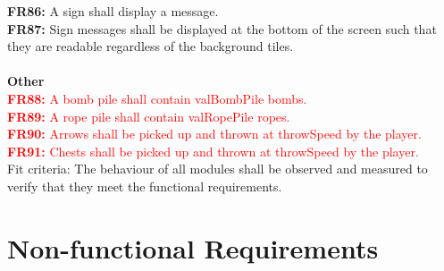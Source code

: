 \documentclass[12pt, titlepage]{article}
\begin{document}
\textbf{FR86:} A sign shall display a message.\\
\textbf{FR87:} Sign messages shall be displayed at the bottom of the screen such that they are readable regardless of the background tiles.\\ 
\\
\textbf{Other}\\
\textcolor{red}{\textbf{FR88:} A bomb pile shall contain valBombPile bombs.}\\
\textcolor{red}{\textbf{FR89:} A rope pile shall contain valRopePile ropes.}\\
\textcolor{red}{\textbf{FR90:} Arrows shall be picked up and thrown at throwSpeed by the player.}\\
\textcolor{red}{\textbf{FR91:} Chests shall be picked up and thrown at throwSpeed by the player.}\\


Fit criteria: The behaviour of all modules shall be observed and measured to verify that they meet the functional requirements.

\section{Non-functional Requirements}
\end{document}
